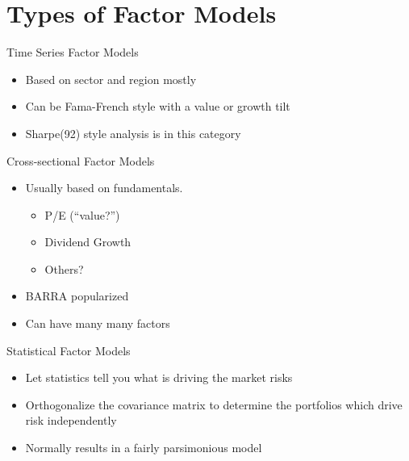 \section{Types of Factor Models}\label{types-of-factor-models}

\begin{frame}{Time Series Factor Models}

\begin{itemize}
\itemsep1pt\parskip0pt
\item
  Based on sector and region mostly
\item
  Can be Fama-French style with a value or growth tilt
\item
  Sharpe(92) style analysis is in this category
\end{itemize}

\end{frame}

\begin{frame}{Cross-sectional Factor Models}

\begin{itemize}
\itemsep1pt\parskip0pt
\item
  Usually based on fundamentals.

  \begin{itemize}
  \itemsep1pt\parskip0pt
  \item
    P/E (``value?'')
  \item
    Dividend Growth
  \item
    Others?
  \end{itemize}
\item
  BARRA popularized
\item
  Can have many many factors
\end{itemize}

\end{frame}

\begin{frame}{Statistical Factor Models}

\begin{itemize}
\itemsep1pt\parskip0pt
\item
  Let statistics tell you what is driving the market risks
\item
  Orthogonalize the covariance matrix to determine the portfolios which
  drive risk independently
\item
  Normally results in a fairly parsimonious model
\end{itemize}

\end{frame}


